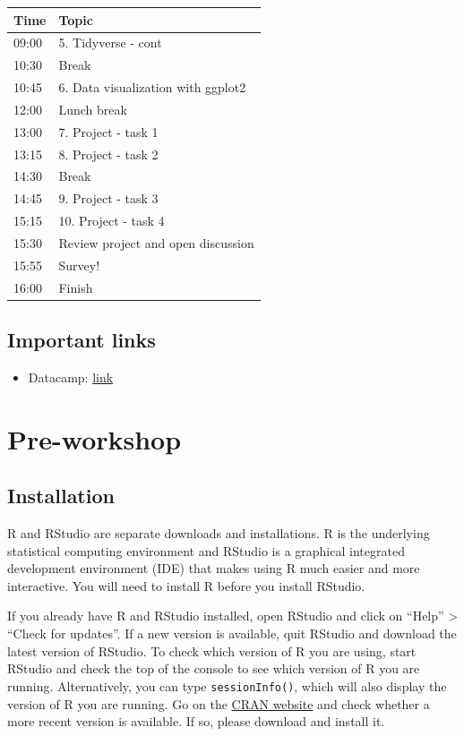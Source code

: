 \documentclass[
]{book}
\providecommand{\tightlist}{%
  \setlength{\itemsep}{0pt}\setlength{\parskip}{0pt}}
\begin{document}
\begin{longtable}[]{@{}ll@{}}
\toprule
Time & Topic \\
\midrule
\endhead
09:00 & 5. Tidyverse - cont \\
10:30 & Break \\
10:45 & 6. Data visualization with ggplot2 \\
12:00 & Lunch break \\
13:00 & 7. Project - task 1 \\
13:15 & 8. Project - task 2 \\
14:30 & Break \\
14:45 & 9. Project - task 3 \\
15:15 & 10. Project - task 4 \\
15:30 & Review project and open discussion \\
15:55 & Survey! \\
16:00 & Finish \\
\bottomrule
\end{longtable}

\hypertarget{important-links}{%
\section{Important links}\label{important-links}}

\begin{itemize}
\tightlist
\item
  Datacamp: \href{https://www.datacamp.com/home}{link}
\end{itemize}

\hypertarget{pre-workshop}{%
\chapter{Pre-workshop}\label{pre-workshop}}

\hypertarget{installation}{%
\section{Installation}\label{installation}}

R and RStudio are separate downloads and installations. R is the underlying statistical computing environment and RStudio is a graphical integrated development environment (IDE) that makes using R much easier and more interactive. You will need to install R before you install RStudio.

If you already have R and RStudio installed, open RStudio and click on ``Help'' \textgreater{} ``Check for updates''. If a new version is available, quit RStudio and download the latest version of RStudio. To check which version of R you are using, start RStudio and check the top of the console to see which version of R you are running. Alternatively, you can type \texttt{sessionInfo()}, which will also display the version of R you are running. Go on the \href{https://cran.r-project.org/bin/windows/base/}{CRAN website} and check whether a more recent version is available. If so, please download and install it.
\end{document}
